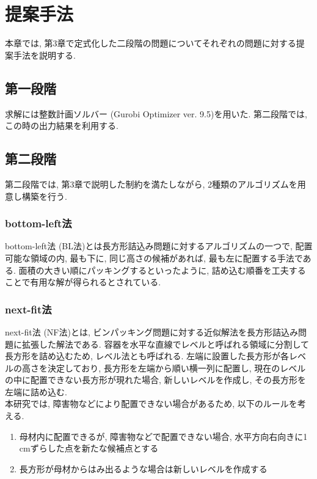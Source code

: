 \chapter{提案手法}\label{method}
本章では, 第3章で定式化した二段階の問題についてそれぞれの問題に対する提案手法を説明する. 

\section{第一段階}
求解には整数計画ソルバー (Gurobi Optimizer ver. 9.5)を用いた. 
第二段階では, この時の出力結果を利用する.  

\section{第二段階}
第二段階では, 第3章で説明した制約を満たしながら, 2種類のアルゴリズムを用意し構築を行う. 


\subsection{bottom-left法}
bottom-left法 (BL法)とは長方形詰込み問題に対するアルゴリズムの一つで, 配置可能な領域の内, 最も下に, 同じ高さの候補があれば, 最も左に配置する手法である\cite{nfp2}. 
面積の大きい順にパッキングするといったように, 詰め込む順番を工夫することで有用な解が得られるとされている. \\

\subsection{next-fit法}
next-fit法 (NF法)とは, ビンパッキング問題に対する近似解法を長方形詰込み問題に拡張した解法である\cite{next-fit}. 
容器を水平な直線でレベルと呼ばれる領域に分割して長方形を詰め込むため, レベル法とも呼ばれる. 
左端に設置した長方形が各レベルの高さを決定しており, 長方形を左端から順い横一列に配置し, 現在のレベルの中に配置できない長方形が現れた場合, 新しいレベルを作成し, その長方形を左端に詰め込む. \\

本研究では, 障害物などにより配置できない場合があるため, 以下のルールを考える. 
\begin{enumerate}
    \item 母材内に配置できるが, 障害物などで配置できない場合, 水平方向右向きに1 cmずらした点を新たな候補点とする
    \item 長方形が母材からはみ出るような場合は新しいレベルを作成する
\end{enumerate}


